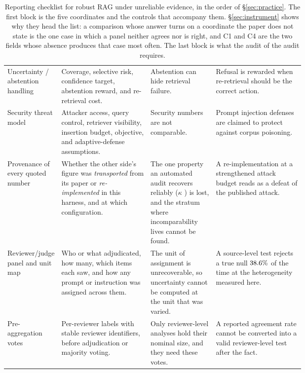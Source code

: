 \begin{table}[t]
\begin{tabularx}{\linewidth}{>{\raggedright\arraybackslash}p{0.18\linewidth}>{\raggedright\arraybackslash}p{0.30\linewidth}>{\raggedright\arraybackslash}p{0.22\linewidth}X}
Uncertainty / abstention handling & Coverage, selective risk, confidence target, abstention reward, and re-retrieval cost. & Abstention can hide retrieval failure. & Refusal is rewarded when re-retrieval should be the correct action. \\
Security threat model & Attacker access, query control, retriever visibility, insertion budget, objective, and adaptive-defense assumptions. & Security numbers are not comparable. & Prompt injection defenses are claimed to protect against corpus poisoning. \\
\midrule
Provenance of every quoted number & Whether the other side's figure was \emph{transported} from its paper or \emph{re-implemented} in this harness, and at which configuration. & The one property an automated audit recovers reliably ($\kappa$ \DecProvK{}) is lost, and the stratum where incomparability lives cannot be found. & A re-implementation at a strengthened attack budget reads as a defeat of the published attack. \\
Reviewer/judge panel and unit map & Who or what adjudicated, how many, which items each saw, and how any prompt or instruction was assigned across them. & The unit of assignment is unrecoverable, so uncertainty cannot be computed at the unit that was varied. & A source-level test rejects a true null $38.6\%$ of the time at the heterogeneity measured here. \\
Pre-aggregation votes & Per-reviewer labels with stable reviewer identifiers, before adjudication or majority voting. & Only reviewer-level analyses hold their nominal size, and they need these votes. & A reported agreement rate cannot be converted into a valid reviewer-level test after the fact. \\
\bottomrule
\end{tabularx}
\caption{Reporting checklist for robust RAG under unreliable evidence, in the order of \S\ref{sec:practice}. The first block is the five coordinates and the controls that accompany them. \S\ref{sec:instrument} shows why they head the list: a comparison whose answer turns on a coordinate the paper does not state is the one case in which a panel neither agrees nor is right, and C1 and C4 are the two fields whose absence produces that case most often. The last block is what the audit of the audit requires.}
\label{tab:robust-rag-reporting-checklist}
\end{table}
